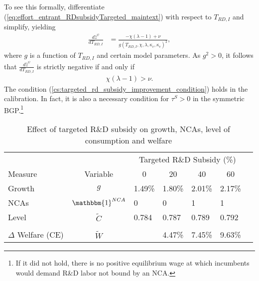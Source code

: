 \documentclass[ecta,nameyear,final]{econsocart}
\theoremstyle{plain}
\theoremstyle{remark}
\begin{document}
To see this formally, differentiate (\ref{eq:effort_entrant_RDsubsidyTargeted_maintext}) with respect to $T_{RD,I}$ and simplify, yielding
\begin{align}
	\frac{d\hat{z}^{\psi}}{dT_{RD,I}} &= \frac{-\chi(\lambda -1) + \nu }{g(T_{RD,I},\chi,\lambda,\kappa_c,\kappa_e)^2},
\end{align}
where $g$ is a function of $T_{RD,I}$ and certain model parameters. As $g^2 > 0$, it follows that $\frac{d\hat{z}^{\psi}}{dT_{RD,I}}$ is strictly negative if and only if 
\begin{align}
	\chi(\lambda -1) > \nu. \label{cs:targeted_rd_subsidy_improvement_condition}
\end{align}
The condition (\ref{cs:targeted_rd_subsidy_improvement_condition}) holds in the calibration. In fact, it is also a necessary condition for $\tau^S > 0$ in the symmetric BGP.\footnote{If it did not hold, there is no positive equilibrium wage at which incumbents would demand R\&D labor not bound by an NCA.}

\begin{table}
	\centering
	\caption{Effect of targeted R\&D subsidy on growth, NCAs, level of consumption and welfare}\label{oirdsubsidy_table}
	\begin{tabular}{lclllll}
		\toprule \toprule
		&  & \multicolumn{4}{c}{Targeted R\&D Subsidy (\%)} \vspace{3pt}  \tabularnewline
		Measure &Variable &  \multicolumn{1}{c}{0} & \multicolumn{1}{c}{20} & \multicolumn{1}{c}{40} & \multicolumn{1}{c}{60} \tabularnewline
		\midrule
		Growth & $g$ & 1.49\% & 1.80\% & 2.01\% & 2.17\% \tabularnewline
		NCAs & $\mathbbm{1}^{NCA}$ & 0 & 0 & 1 & 1 \tabularnewline
		Level & $\tilde{C}$  & 0.784 &  0.787 & 0.789 & 0.792 \tabularnewline 
		\tabularnewline
		$\Delta$ Welfare (CE) & $\tilde{W}$  &  & 4.47\% & 7.45\% & 9.63\% \tabularnewline
		\bottomrule
	\end{tabular}
\end{table}
\end{document}

